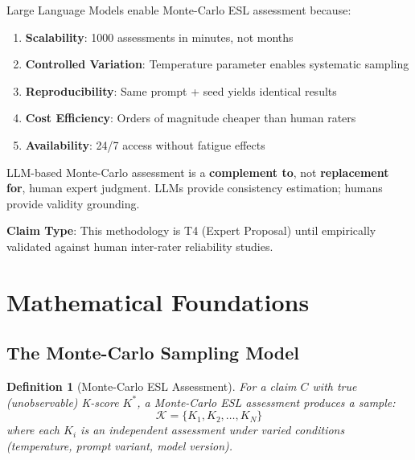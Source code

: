 \documentclass[11pt,a4paper]{article}
\newtheorem{definition}{Definition}[section]
\theoremstyle{remark}
\begin{document}
Large Language Models enable Monte-Carlo ESL assessment because:

\begin{enumerate}
    \item \textbf{Scalability}: 1000 assessments in minutes, not months
    \item \textbf{Controlled Variation}: Temperature parameter enables systematic sampling
    \item \textbf{Reproducibility}: Same prompt + seed yields identical results
    \item \textbf{Cost Efficiency}: Orders of magnitude cheaper than human raters
    \item \textbf{Availability}: 24/7 access without fatigue effects
\end{enumerate}

\begin{warningbox}
LLM-based Monte-Carlo assessment is a \textbf{complement to}, not \textbf{replacement for}, human expert judgment. LLMs provide consistency estimation; humans provide validity grounding.

\textbf{Claim Type}: This methodology is T4 (Expert Proposal) until empirically validated against human inter-rater reliability studies.
\end{warningbox}


\section{Mathematical Foundations}
\label{sec:foundations}

\subsection{The Monte-Carlo Sampling Model}

\begin{definition}[Monte-Carlo ESL Assessment]
\label{def:mc-assessment}
For a claim $C$ with true (unobservable) K-score $K^*$, a Monte-Carlo ESL assessment produces a sample:
\begin{equation}
\mathcal{K} = \{K_1, K_2, \ldots, K_N\}
\end{equation}
where each $K_i$ is an independent assessment under varied conditions (temperature, prompt variant, model version).
\end{definition}
\end{document}
